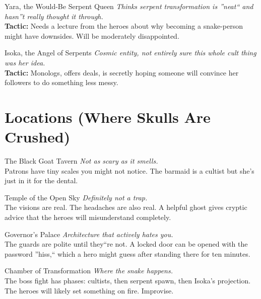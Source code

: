 \documentclass[11pt]{article}
\begin{document}
\begin{npcbox}{Yara, the Would-Be Serpent Queen}
\textit{Thinks serpent transformation is ''neat`` and hasn''t really thought it through.} \\
\textbf{Tactic:} Needs a lecture from the heroes about why becoming a snake-person might have downsides. Will be moderately disappointed.
\end{npcbox}

\begin{npcbox}{Isoka, the Angel of Serpents}
\textit{Cosmic entity, not entirely sure this whole cult thing was her idea.} \\
\textbf{Tactic:} Monologs, offers deals, is secretly hoping someone will convince her followers to do something less messy.
\end{npcbox}

\section*{Locations (Where Skulls Are Crushed)}

\begin{locationbox}{The Black Goat Tavern}
\textit{Not as scary as it smells.} \\
Patrons have tiny scales you might not notice. The barmaid is a cultist but she's just in it for the dental.
\end{locationbox}

\begin{locationbox}{Temple of the Open Sky}
\textit{Definitely not a trap.} \\
The visions are real. The headaches are also real. A helpful ghost gives cryptic advice that the heroes will misunderstand completely.
\end{locationbox}

\begin{locationbox}{Governor's Palace}
\textit{Architecture that actively hates you.} \\
The guards are polite until they``re not. A locked door can be opened with the password ''hiss,`` which a hero might guess after standing there for ten minutes.
\end{locationbox}

\begin{locationbox}{Chamber of Transformation}
\textit{Where the snake happens.} \\
The boss fight has phases: cultists, then serpent spawn, then Isoka's projection. The heroes will likely set something on fire. Improvise.
\end{locationbox}
\end{document}
